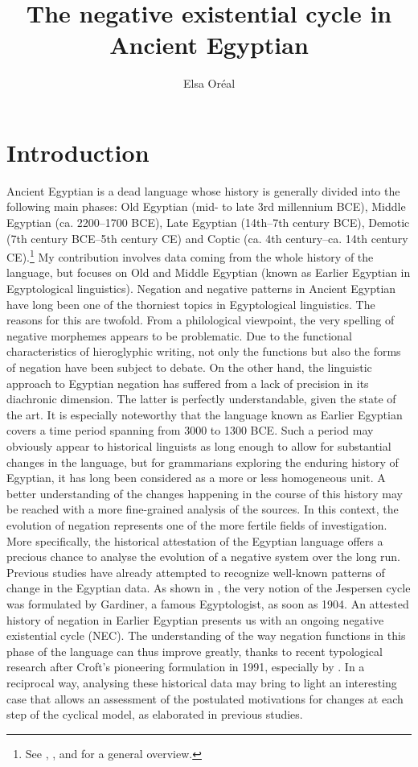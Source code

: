 \documentclass[output=paper,draft,draftmode,colorlinks,citecolor=brown]{langscibook}
\author{Elsa Oréal\affiliation{French National Centre for Scientific Research}}
\title{The negative existential cycle in Ancient Egyptian}
\begin{document}
\maketitle

\section{Introduction}\label{s:AE1}
Ancient Egyptian is a dead language whose history is generally divided into the following main phases: Old Egyptian (mid- to late 3rd millennium BCE), Middle Egyptian (ca. 2200–1700 BCE), Late Egyptian (14th–7th century BCE), Demotic (7th century BCE–5th century CE) and Coptic (ca. 4th century–ca. 14th century CE).\footnote{See \citet{Loprieno1995}, \citet{LoprienoMuller2012}, and \citet{GrossmanRichter} for a general overview.} My contribution involves data coming from the whole history of the language, but focuses on Old and Middle Egyptian (known as Earlier Egyptian in Egyptological linguistics). Negation and negative patterns in Ancient Egyptian have long been one of the thorniest topics in Egyptological linguistics. The reasons for this are twofold. From a philological viewpoint, the very spelling of negative morphemes appears to be problematic. Due to the functional characteristics of hieroglyphic writing, not only the functions but also the forms of negation have been subject to debate. On the other hand, the linguistic approach to Egyptian negation has suffered from a lack of precision in its diachronic dimension. The latter is perfectly understandable, given the state of the art. It is especially noteworthy that the language known as Earlier Egyptian covers a time period spanning from 3000 to 1300 BCE. Such a period may obviously appear to historical linguists as long enough to allow for substantial changes in the language, but for grammarians exploring the enduring history of Egyptian, it has long been considered as a more or less homogeneous unit. A better understanding of the changes happening in the course of this history may be reached with a more fine-grained analysis of the sources. In this context, the evolution of negation represents one of the more fertile fields of investigation. More specifically, the historical attestation of the Egyptian language offers a precious chance to analyse the evolution of a negative system over the long run. Previous studies have already attempted to recognize well-known patterns of change in the Egyptian data. As shown in \citet{vanderAuwera2009}, the very notion of the Jespersen cycle was formulated by Gardiner, a famous Egyptologist, as soon as 1904. An attested history of negation in Earlier Egyptian presents us with an ongoing negative existential cycle (NEC). The understanding of the way negation functions in this phase of the language can thus improve greatly, thanks to recent typological research after Croft’s pioneering formulation in 1991, especially by \citet{Veselinova2013, Veselinova2014, Veselinova2016}. In a reciprocal way, analysing these historical data may bring to light an interesting case that allows an assessment of the postulated motivations for changes at each step of the cyclical model, as elaborated in previous studies.
\end{document}
